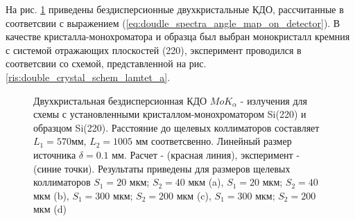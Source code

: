 
\label{sec:non_disspers_KDO_section}
На рис. \ref{ris:non_disspers_kdo} приведены бездисперсионные двухкристальные КДО, рассчитанные в соответсвии
с выражением (\ref{eq:doudle_spectra_angle_map_on_detector}). В качестве кристалла-монохроматора
и образца был выбран монокристалл кремния с системой отражающих плоскостей (220), эксперимент проводился в
соответсвии со схемой, представленной на рис. \ref{ris:double_crystal_schem_lamtet_a}.

\begin{figure}[H]
  \centering
  \hfill
  \hfill
  \hfill
  \caption{Двухкристальная бездисперсионная КДО $MoK_{\alpha}$ - излучения для схемы с установленными
   кристаллом-монохроматором Si(220) и образцом Si(220). Расстояние до щелевых коллиматоров
  составляет $L_1= 570 $мм, $L_2 = 1005$ мм соответсвенно.
  Линейный размер источника $\delta = 0.1$ мм. Расчет - (красная линия), эксперимент - (синие точки).
  Результаты приведены для размеров щелевых коллиматоров  $S_1 = 20 $ мкм; $ S_2 = 40$ мкм (a),
    $S_1 = 20 $ мкм; $ S_2 = 40$ мкм (b),
   $S_1 = 300 $ мкм; $ S_2 = 200$ мкм (c),
    $S_1 = 300 $ мкм; $ S_2 = 200$ мкм (d)}
  \label{ris:non_disspers_kdo}
\end{figure}

